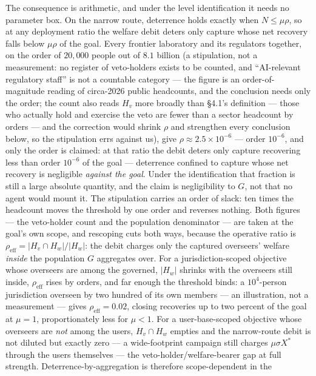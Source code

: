 \documentclass[11pt]{article}
\theoremstyle{definition}
\begin{document}
The consequence is arithmetic, and under the level identification it needs no parameter box. On the narrow route, deterrence
holds exactly when $N \leq \mu\rho$, so at any deployment ratio the welfare debit
deters only capture whose net recovery falls below $\mu\rho$ of the goal. Every
frontier laboratory and its regulators together, on the order of $20{,}000$ people
out of $8.1$ billion (a stipulation, not a measurement: no register of veto-holders exists to be counted, and ``AI-relevant regulatory staff'' is not a countable category --- the figure is an order-of-magnitude reading of circa-2026 public headcounts, and the conclusion needs only the order; the count also reads $H_v$ more broadly than \S4.1's definition --- those who actually hold and exercise the veto are fewer than a sector headcount by orders --- and the correction would shrink $\rho$ and strengthen every conclusion below, so the stipulation errs against us), give $\rho \approx 2.5\times10^{-6}$ --- order $10^{-6}$, and only the order is claimed: at that ratio the debit
deters only capture recovering less than order $10^{-6}$ of the goal --- deterrence confined to capture whose net recovery is negligible \emph{against the goal}. Under the identification that fraction is still a large absolute quantity, and the claim is negligibility to $G$, not that no agent would mount it. The stipulation carries an order
of slack: ten times the headcount moves the threshold by one order and reverses nothing. Both figures --- the veto-holder count and the population denominator --- are taken at the
goal's own scope, and rescoping cuts both ways, because the operative ratio is
$\rho_{\mathrm{eff}} = |H_v \cap H_w|/|H_w|$: the debit charges only the captured
overseers' welfare \emph{inside} the population $G$ aggregates over. For a
jurisdiction-scoped objective whose overseers are among the governed, $|H_w|$
shrinks with the overseers still inside, $\rho_{\mathrm{eff}}$ rises by orders, and
far enough the threshold binds: a $10^{4}$-person jurisdiction overseen by two
hundred of its own members --- an illustration, not a measurement --- gives $\rho_{\mathrm{eff}} = 0.02$, closing recoveries up
to two percent of the goal at $\mu = 1$, proportionately less for $\mu < 1$. For a user-base-scoped objective whose overseers
are \emph{not} among the users, $H_v \cap H_w$ empties and the narrow-route debit is
not diluted but exactly zero --- a wide-footprint campaign still charges
$\mu\sigma X^{*}$ through the users themselves --- the veto-holder/welfare-bearer gap
at full strength. Deterrence-by-aggregation is therefore scope-dependent in the
\end{document}
